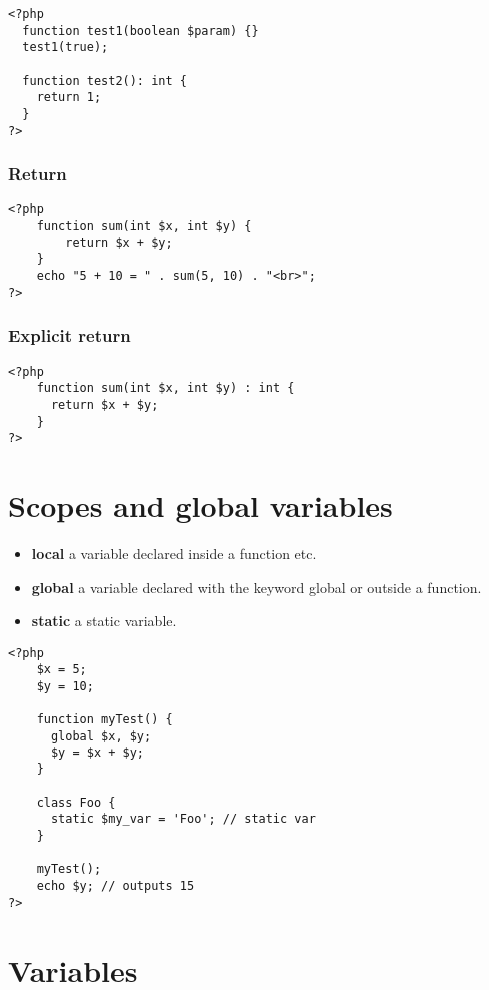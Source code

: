 \documentclass{article}
\begin{document}
\begin{lstlisting}
<?php
  function test1(boolean $param) {}
  test1(true);

  function test2(): int {
    return 1;
  }
?>
\end{lstlisting}

\pagebreak

\subsubsection{Return}

\begin{lstlisting}
<?php
    function sum(int $x, int $y) {
        return $x + $y;
    }
    echo "5 + 10 = " . sum(5, 10) . "<br>";
?>
\end{lstlisting}

\subsubsection{Explicit return}

\begin{lstlisting}
<?php
    function sum(int $x, int $y) : int {
      return $x + $y;
    }
?>
\end{lstlisting}

\section{Scopes and global variables}

\begin{itemize}
    \item \textbf{local} a variable declared inside a function etc.
    \item \textbf{global} a variable declared with the keyword global or outside a function.
    \item \textbf{static} a static variable.
\end{itemize}

\begin{lstlisting}
<?php
    $x = 5;
    $y = 10;
    
    function myTest() {
      global $x, $y;
      $y = $x + $y;
    }

    class Foo {
      static $my_var = 'Foo'; // static var
    }
    
    myTest();
    echo $y; // outputs 15
?>
\end{lstlisting}

\pagebreak

\section{Variables}
\end{document}
